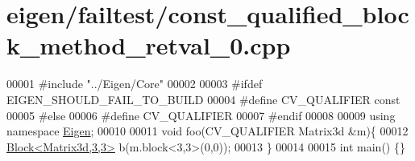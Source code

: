 \hypertarget{eigen_2failtest_2const__qualified__block__method__retval__0_8cpp_source}{}\section{eigen/failtest/const\+\_\+qualified\+\_\+block\+\_\+method\+\_\+retval\+\_\+0.cpp}
\label{eigen_2failtest_2const__qualified__block__method__retval__0_8cpp_source}

\begin{DoxyCode}
00001 \textcolor{preprocessor}{#include "../Eigen/Core"}
00002 
00003 \textcolor{preprocessor}{#ifdef EIGEN\_SHOULD\_FAIL\_TO\_BUILD}
00004 \textcolor{preprocessor}{#define CV\_QUALIFIER const}
00005 \textcolor{preprocessor}{#else}
00006 \textcolor{preprocessor}{#define CV\_QUALIFIER}
00007 \textcolor{preprocessor}{#endif}
00008 
00009 \textcolor{keyword}{using namespace }\hyperlink{namespace_eigen}{Eigen};
00010 
00011 \textcolor{keywordtype}{void} foo(CV\_QUALIFIER Matrix3d &m)\{
00012     \hyperlink{group___core___module_class_eigen_1_1_block}{Block<Matrix3d,3,3>} b(m.block<3,3>(0,0));
00013 \}
00014 
00015 \textcolor{keywordtype}{int} main() \{\}
\end{DoxyCode}
